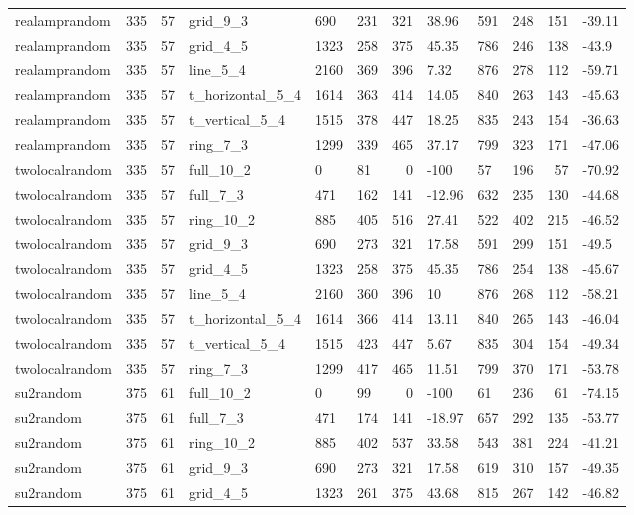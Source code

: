 \begin{longtable}{lrrlllrlllrl}
realamprandom & 335 & 57 & grid\_9\_3 & 690 & 231 & 321 & 38.96 & 591 & 248 & 151 & -39.11 \\
realamprandom & 335 & 57 & grid\_4\_5 & 1323 & 258 & 375 & 45.35 & 786 & 246 & 138 & -43.9 \\
realamprandom & 335 & 57 & line\_5\_4 & 2160 & 369 & 396 & 7.32 & 876 & 278 & 112 & -59.71 \\
realamprandom & 335 & 57 & t\_horizontal\_5\_4 & 1614 & 363 & 414 & 14.05 & 840 & 263 & 143 & -45.63 \\
realamprandom & 335 & 57 & t\_vertical\_5\_4 & 1515 & 378 & 447 & 18.25 & 835 & 243 & 154 & -36.63 \\
realamprandom & 335 & 57 & ring\_7\_3 & 1299 & 339 & 465 & 37.17 & 799 & 323 & 171 & -47.06 \\
twolocalrandom & 335 & 57 & full\_10\_2 & 0 & 81 & 0 & -100 & 57 & 196 & 57 & -70.92 \\
twolocalrandom & 335 & 57 & full\_7\_3 & 471 & 162 & 141 & -12.96 & 632 & 235 & 130 & -44.68 \\
twolocalrandom & 335 & 57 & ring\_10\_2 & 885 & 405 & 516 & 27.41 & 522 & 402 & 215 & -46.52 \\
twolocalrandom & 335 & 57 & grid\_9\_3 & 690 & 273 & 321 & 17.58 & 591 & 299 & 151 & -49.5 \\
twolocalrandom & 335 & 57 & grid\_4\_5 & 1323 & 258 & 375 & 45.35 & 786 & 254 & 138 & -45.67 \\
twolocalrandom & 335 & 57 & line\_5\_4 & 2160 & 360 & 396 & 10 & 876 & 268 & 112 & -58.21 \\
twolocalrandom & 335 & 57 & t\_horizontal\_5\_4 & 1614 & 366 & 414 & 13.11 & 840 & 265 & 143 & -46.04 \\
twolocalrandom & 335 & 57 & t\_vertical\_5\_4 & 1515 & 423 & 447 & 5.67 & 835 & 304 & 154 & -49.34 \\
twolocalrandom & 335 & 57 & ring\_7\_3 & 1299 & 417 & 465 & 11.51 & 799 & 370 & 171 & -53.78 \\
su2random & 375 & 61 & full\_10\_2 & 0 & 99 & 0 & -100 & 61 & 236 & 61 & -74.15 \\
su2random & 375 & 61 & full\_7\_3 & 471 & 174 & 141 & -18.97 & 657 & 292 & 135 & -53.77 \\
su2random & 375 & 61 & ring\_10\_2 & 885 & 402 & 537 & 33.58 & 543 & 381 & 224 & -41.21 \\
su2random & 375 & 61 & grid\_9\_3 & 690 & 273 & 321 & 17.58 & 619 & 310 & 157 & -49.35 \\
su2random & 375 & 61 & grid\_4\_5 & 1323 & 261 & 375 & 43.68 & 815 & 267 & 142 & -46.82 \\

\end{longtable}
